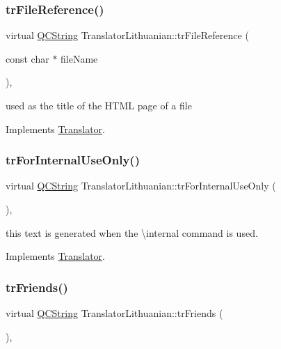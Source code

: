 \subsubsection{\texorpdfstring{trFileReference()}{trFileReference()}}
{\footnotesize\ttfamily virtual \mbox{\hyperlink{class_q_c_string}{Q\+C\+String}} Translator\+Lithuanian\+::tr\+File\+Reference (\begin{DoxyParamCaption}\item[{const char $\ast$}]{file\+Name }\end{DoxyParamCaption})\hspace{0.3cm}{\ttfamily [inline]}, {\ttfamily [virtual]}}

used as the title of the H\+T\+ML page of a file 

Implements \mbox{\hyperlink{class_translator}{Translator}}.

\mbox{\label{class_translator_lithuanian_abe1623ac7cc45272038c7beceaf4b095}} 
\subsubsection{\texorpdfstring{trForInternalUseOnly()}{trForInternalUseOnly()}}
{\footnotesize\ttfamily virtual \mbox{\hyperlink{class_q_c_string}{Q\+C\+String}} Translator\+Lithuanian\+::tr\+For\+Internal\+Use\+Only (\begin{DoxyParamCaption}{ }\end{DoxyParamCaption})\hspace{0.3cm}{\ttfamily [inline]}, {\ttfamily [virtual]}}

this text is generated when the \textbackslash{}internal command is used. 

Implements \mbox{\hyperlink{class_translator}{Translator}}.

\mbox{\label{class_translator_lithuanian_a6cbc8c8888992e2daaf09ce6746fabcd}} 
\subsubsection{\texorpdfstring{trFriends()}{trFriends()}}
{\footnotesize\ttfamily virtual \mbox{\hyperlink{class_q_c_string}{Q\+C\+String}} Translator\+Lithuanian\+::tr\+Friends (\begin{DoxyParamCaption}{ }\end{DoxyParamCaption})\hspace{0.3cm}{\ttfamily [inline]}, {\ttfamily [virtual]}}

